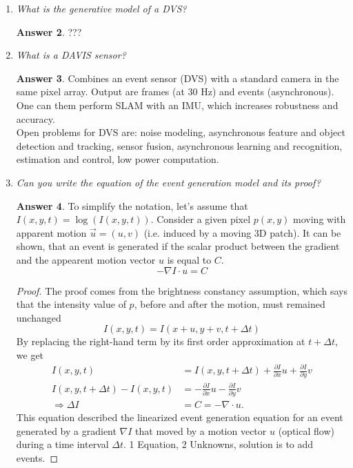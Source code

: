 \documentclass[a4paper,12 pt]{article}
\theoremstyle{definition}
\theoremstyle{remark}
\theoremstyle{definition}
\theoremstyle{definition}
\theoremstyle{definition}
\theoremstyle{definition}
\theoremstyle{remark}
\theoremstyle{remark}
\theoremstyle{definition}
\theoremstyle{definition}
\newtheorem*{answer}{Answer}
\begin{document}
\begin{enumerate}
\begin{answer}
\end{answer}
\item \textit{What is the generative model of a DVS? }
\begin{answer}
???
\end{answer}
\item \textit{What is a DAVIS sensor?}
\begin{answer}
Combines an event sensor (DVS) with a standard camera in the same pixel array. Output are frames (at 30 Hz) and events (asynchronous). One can them perform SLAM with an IMU, which increases robustness and accuracy. \\
Open problems for DVS are: noise modeling, asynchronous feature and object detection and tracking, sensor fusion, asynchronous learning and recognition, estimation and control, low power computation.

\end{answer}
\item \textit{ Can you write the equation of the event generation model and its proof?}
\begin{answer}
To simplify the notation, let's assume that $I(x,y,t)=\log(I(x,y,t))$. Consider a given pixel $p(x,y)$ moving with apparent motion $\vec{u}=(u,v)$ (i.e. induced by a moving 3D patch). It can be shown, that an event is generated if the scalar product between the gradient and the appearent motion vector $u$ is equal to $C$.
\begin{equation}
-\nabla I \cdot u=C
\end{equation}
\begin{proof}
The proof comes from the brightness constancy assumption, which says that the intensity value of $p$, before and after the motion, must remained unchanged
\begin{equation}
I(x,y,t)=I(x+u,y+v,t+\Delta t)
\end{equation}
By replacing the right-hand term by its first order approximation at $t+\Delta t$, we get
\begin{equation}
\begin{split}
I(x,y,t)&=I(x,y,t+\Delta t)+ \frac{\partial I}{\partial x}u+\frac{\partial I}{\partial y}v\\
I(x,y,t+\Delta t)-I(x,y,t)&=-\frac{\partial I}{\partial x}u-\frac{\partial I}{\partial y}v\\
\Rightarrow \Delta I &= C= -\nabla \cdot u.
\end{split}
\end{equation}
This equation described the linearized event generation equation for an event generated by a gradient $\nabla I$ that moved by a motion vector $u$ (optical flow) during a time interval $\Delta t$. 1 Equation, 2 Unknowns, solution is to add events.
\end{proof}
\end{answer}
\end{enumerate}
\newpage
\newpage
\end{document}
